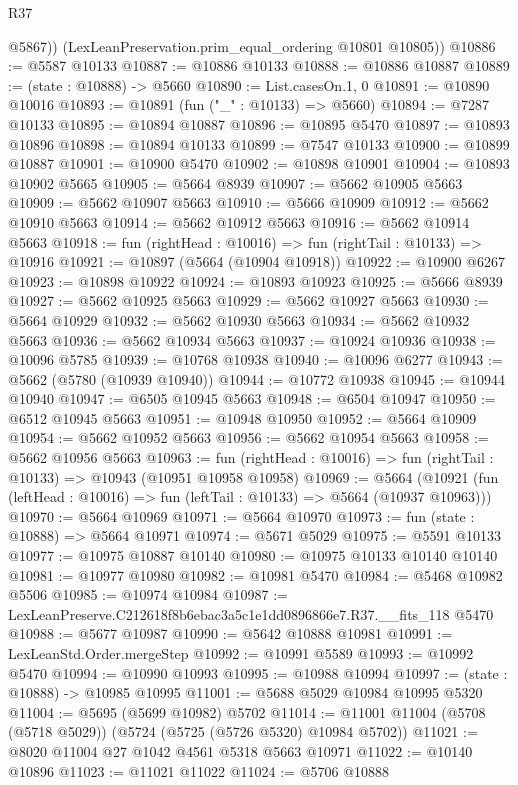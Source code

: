 \begin{lexlean}{R37}
\begin{coremodule}
          @5867))
      (LexLeanPreservation.prim_equal_ordering @10801 @10805))
@10886 := @5587 @10133
@10887 := @10886 @10133
@10888 := @10886 @10887
@10889 := (state : @10888) -> @5660
@10890 := List.casesOn.{1, 0}
@10891 := @10890 @10016
@10893 := @10891 (fun ("_" : @10133) => @5660)
@10894 := @7287 @10133
@10895 := @10894 @10887
@10896 := @10895 @5470
@10897 := @10893 @10896
@10898 := @10894 @10133
@10899 := @7547 @10133
@10900 := @10899 @10887
@10901 := @10900 @5470
@10902 := @10898 @10901
@10904 := @10893 @10902 @5665
@10905 := @5664 @8939
@10907 := @5662 @10905 @5663
@10909 := @5662 @10907 @5663
@10910 := @5666 @10909
@10912 := @5662 @10910 @5663
@10914 := @5662 @10912 @5663
@10916 := @5662 @10914 @5663
@10918 := fun (rightHead : @10016) => fun (rightTail : @10133) => @10916
@10921 := @10897 (@5664 (@10904 @10918))
@10922 := @10900 @6267
@10923 := @10898 @10922
@10924 := @10893 @10923
@10925 := @5666 @8939
@10927 := @5662 @10925 @5663
@10929 := @5662 @10927 @5663
@10930 := @5664 @10929
@10932 := @5662 @10930 @5663
@10934 := @5662 @10932 @5663
@10936 := @5662 @10934 @5663
@10937 := @10924 @10936
@10938 := @10096 @5785
@10939 := @10768 @10938
@10940 := @10096 @6277
@10943 := @5662 (@5780 (@10939 @10940))
@10944 := @10772 @10938
@10945 := @10944 @10940
@10947 := @6505 @10945 @5663
@10948 := @6504 @10947
@10950 := @6512 @10945 @5663
@10951 := @10948 @10950
@10952 := @5664 @10909
@10954 := @5662 @10952 @5663
@10956 := @5662 @10954 @5663
@10958 := @5662 @10956 @5663
@10963 := fun (rightHead : @10016) => fun (rightTail : @10133) => @10943 (@10951 @10958 @10958)
@10969 := @5664
    (@10921 (fun (leftHead : @10016) => fun (leftTail : @10133) => @5664 (@10937 @10963)))
@10970 := @5664 @10969
@10971 := @5664 @10970
@10973 := fun (state : @10888) => @5664 @10971
@10974 := @5671 @5029
@10975 := @5591 @10133
@10977 := @10975 @10887 @10140
@10980 := @10975 @10133 @10140 @10140
@10981 := @10977 @10980
@10982 := @10981 @5470
@10984 := @5468 @10982 @5506
@10985 := @10974 @10984
@10987 := LexLeanPreserve.C212618f8b6ebac3a5c1e1dd0896866e7.R37.__fits_118 @5470
@10988 := @5677 @10987
@10990 := @5642 @10888 @10981
@10991 := LexLeanStd.Order.mergeStep
@10992 := @10991 @5589
@10993 := @10992 @5470
@10994 := @10990 @10993
@10995 := @10988 @10994
@10997 := (state : @10888) -> @10985 @10995
@11001 := @5688 @5029 @10984 @10995 @5320
@11004 := @5695 (@5699 @10982) @5702
@11014 := @11001 @11004 (@5708 (@5718 @5029)) (@5724 (@5725 (@5726 @5320) @10984 @5702))
@11021 := @8020 @11004 @27 @1042 @4561 @5318 @5663 @10971
@11022 := @10140 @10896
@11023 := @11021 @11022
@11024 := @5706 @10888

\end{coremodule}
\end{lexlean}
